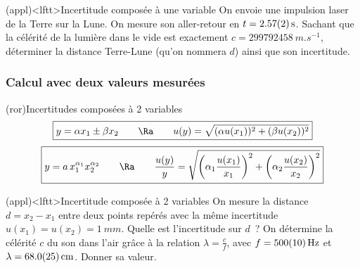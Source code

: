 \documentclass[../../main/main.tex]{subfiles}
\begin{document}
\begin{tcb*}[breakable](appl)<lftt>{Incertitude composée à une variable}
	On envoie une impulsion laser de la Terre sur la Lune. On mesure son
	aller-retour en $t = \SI{2.57 \pm 0.02}{s}$. Sachant que la célérité de la
	lumière dans le vide est exactement $c = \SI{299792458}{m.s^{-1}}$, déterminer
	la distance Terre-Lune (qu'on nommera $d$) ainsi que son incertitude.
	\tcblower
	\vspace*{-10pt}
	\begin{isd}
		\vspace*{-10pt}
		\tcblower
		\vspace*{-10pt}
	\end{isd}
\end{tcb*}

\subsubsection{Calcul avec deux valeurs mesurées}
\begin{tcb*}(ror){Incertitudes composées à 2 variables}
	\[
		\boxed{
			y = \alpha x_1 \pm \beta x_2
			\qquad \Ra \qquad
			u(y) = \sqrt{(\alpha u(x_1))^{2} + (\beta u(x_2))^{2}}}
	\]
	\tcblower
	\[
		\boxed{
		y = a\,x_1^{\alpha_1}x_2^{\alpha_2}
		\qquad \Ra \qquad
		\frac{u(y)}{y} = \sqrt{
			\left(\alpha_1\frac{u(x_1)}{x_1}\right)^{2} +
			\left(\alpha_2\frac{u(x_2)}{x_2}\right)^{2}
		}
		}
	\]
\end{tcb*}

\begin{tcb*}[breakable](appl)<lftt>{Incertitude composée à 2 variables}
	On mesure la distance $d = x_2 - x_1$ entre deux points repérés avec la même
	incertitude $u(x_1) = u(x_2) = \SI{1}{mm}$. Quelle est l'incertitude sur $d$~?
	\smallbreak
	\tcblower
	On détermine la célérité $c$ du son dans l'air grâce à la relation $\lambda =
		\frac{c}{f}$, avec $f = \SI{500 \pm 10}{Hz}$ et $\lambda = \SI{68.0 \pm
			2.5}{cm}$. Donner sa valeur.
	\smallbreak
\end{tcb*}
\end{document}
